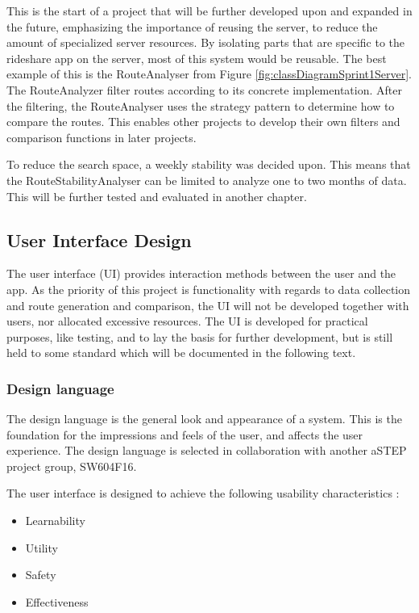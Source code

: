 This is the start of a project that will be further developed upon and expanded in the future, emphasizing the importance of reusing the server, to reduce the amount of specialized server resources.
By isolating parts that are specific to the rideshare app on the server, most of this system would be reusable.
The best example of this is the RouteAnalyser from Figure \ref{fig:classDiagramSprint1Server}.
The RouteAnalyzer filter routes according to its concrete implementation.
After the filtering, the RouteAnalyser uses the strategy pattern to determine how to compare the routes.
This enables other projects to develop their own filters and comparison functions in later projects.

To reduce the search space, a weekly stability was decided upon. 
This means that the RouteStabilityAnalyser can be limited to analyze one to two months of data.
This will be further tested and evaluated in another chapter. 

\subsection{User Interface Design}
The user interface (UI) provides interaction methods between the user and the app.
As the priority of this project is functionality with regards to data collection and route generation and comparison, the UI will not be developed together with users, nor allocated excessive resources. 
The UI is developed for practical purposes, like testing, and to lay the basis for further development, but is still held to some standard which will be documented in the following text. 

\subsubsection{Design language}
The design language is the general look and appearance of a system.
This is the foundation for the impressions and feels of the user, and affects the user experience.
The design language is selected in collaboration with another aSTEP project group, SW604F16.

The user interface is designed to achieve the following usability characteristics \cite{DIS2014}:
\begin{itemize}
	\item Learnability
	\item Utility
	\item Safety
	\item Effectiveness
\end{itemize}

